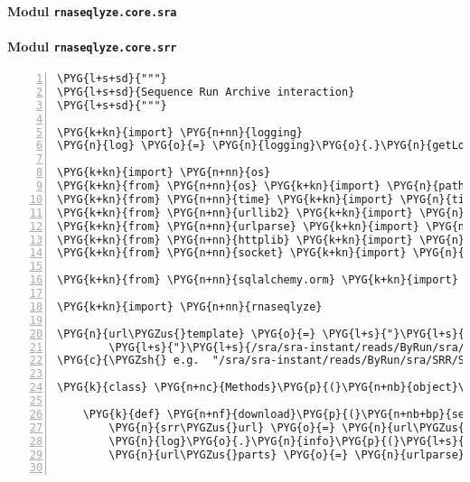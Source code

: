 \paragraph{Modul \texttt{rnaseqlyze.core.sra}}
\label{rnaseqlyze-pdf:modul-rnaseqlyze-core-sra}

\paragraph{Modul \texttt{rnaseqlyze.core.srr}}
\label{rnaseqlyze-pdf:modul-rnaseqlyze-core-srr}
\begin{Verbatim}[commandchars=\\\{\},numbers=left,firstnumber=1,stepnumber=5]
\PYG{l+s+sd}{"""}
\PYG{l+s+sd}{Sequence Run Archive interaction}
\PYG{l+s+sd}{"""}

\PYG{k+kn}{import} \PYG{n+nn}{logging}
\PYG{n}{log} \PYG{o}{=} \PYG{n}{logging}\PYG{o}{.}\PYG{n}{getLogger}\PYG{p}{(}\PYG{n}{\PYGZus{}\PYGZus{}name\PYGZus{}\PYGZus{}}\PYG{p}{)}

\PYG{k+kn}{import} \PYG{n+nn}{os}
\PYG{k+kn}{from} \PYG{n+nn}{os} \PYG{k+kn}{import} \PYG{n}{path}
\PYG{k+kn}{from} \PYG{n+nn}{time} \PYG{k+kn}{import} \PYG{n}{time}
\PYG{k+kn}{from} \PYG{n+nn}{urllib2} \PYG{k+kn}{import} \PYG{n}{urlopen}
\PYG{k+kn}{from} \PYG{n+nn}{urlparse} \PYG{k+kn}{import} \PYG{n}{urlparse}
\PYG{k+kn}{from} \PYG{n+nn}{httplib} \PYG{k+kn}{import} \PYG{n}{HTTPConnection}
\PYG{k+kn}{from} \PYG{n+nn}{socket} \PYG{k+kn}{import} \PYG{n}{timeout}

\PYG{k+kn}{from} \PYG{n+nn}{sqlalchemy.orm} \PYG{k+kn}{import} \PYG{n}{validates}

\PYG{k+kn}{import} \PYG{n+nn}{rnaseqlyze}

\PYG{n}{url\PYGZus{}template} \PYG{o}{=} \PYG{l+s}{"}\PYG{l+s}{http://ftp-private.ncbi.nlm.nih.gov}\PYG{l+s}{"} \PYGZbs{}
        \PYG{l+s}{"}\PYG{l+s}{/sra/sra-instant/reads/ByRun/sra/\PYGZob{}srr:.3\PYGZcb{}/\PYGZob{}srr:.6\PYGZcb{}/\PYGZob{}srr\PYGZcb{}/\PYGZob{}srr\PYGZcb{}.sra}\PYG{l+s}{"}
\PYG{c}{\PYGZsh{} e.g.  "/sra/sra-instant/reads/ByRun/sra/SRR/SRR000/SRR000001/SRR000001.sra"}

\PYG{k}{class} \PYG{n+nc}{Methods}\PYG{p}{(}\PYG{n+nb}{object}\PYG{p}{)}\PYG{p}{:}

    \PYG{k}{def} \PYG{n+nf}{download}\PYG{p}{(}\PYG{n+nb+bp}{self}\PYG{p}{)}\PYG{p}{:}
        \PYG{n}{srr\PYGZus{}url} \PYG{o}{=} \PYG{n}{url\PYGZus{}template}\PYG{o}{.}\PYG{n}{format}\PYG{p}{(}\PYG{n}{srr}\PYG{o}{=}\PYG{n+nb+bp}{self}\PYG{o}{.}\PYG{n}{srr}\PYG{p}{)}
        \PYG{n}{log}\PYG{o}{.}\PYG{n}{info}\PYG{p}{(}\PYG{l+s}{"}\PYG{l+s}{fetching }\PYG{l+s+si}{\PYGZpc{}s}\PYG{l+s}{"} \PYG{o}{\PYGZpc{}} \PYG{n}{srr\PYGZus{}url}\PYG{p}{)}
        \PYG{n}{url\PYGZus{}parts} \PYG{o}{=} \PYG{n}{urlparse}\PYG{p}{(}\PYG{n}{srr\PYGZus{}url}\PYG{p}{)}


\end{Verbatim}
